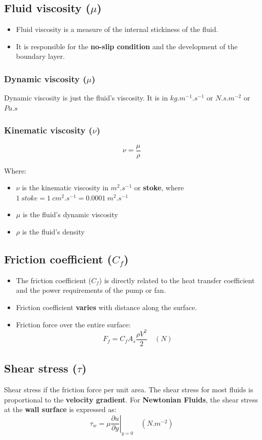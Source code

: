 \documentclass[11pt]{article}
\begin{document}
\subsection{Fluid viscosity (\(\mu\))}
\label{sec:org764c871}
\begin{itemize}
\item Fluid viscosity is a measure of the internal stickiness of the fluid.
\item It is responsible for the \textbf{no-slip condition} and the development of the boundary layer.
\end{itemize}
\subsubsection{Dynamic viscosity (\(\mu\))}
\label{sec:orgcde9aed}
Dynamic viscosity is just the fluid's viscosity. It is in \(\unit{kg.m^{-1}.s^{-1}}\) or \(\unit{N.s.m^{-2}}\) or \(\unit{Pa.s}\)
\subsubsection{Kinematic viscosity (\(\nu\))}
\label{sec:orgcfaa6bc}
\[\nu = \frac{\mu}{\rho}\]

Where:
\begin{itemize}
\item \(\nu\) is the kinematic viscosity in \(\unit{m^2.s^{-1}}\) or \textbf{stoke}, where \(\qty{1}{stoke} = \qty{1}{cm^2.s^{-1}} = \qty{0.0001}{m^2.s^{-1}}\)
\item \(\mu\) is the fluid's dynamic viscosity
\item \(\rho\) is the fluid's density
\end{itemize}
\subsection{Friction coefficient (\(C_f\))}
\label{sec:orge19477a}
\begin{itemize}
\item The friction coefficient (\(C_f\)) is directly related to the heat transfer coefficient and the power requirements of the pump or fan.
\item Friction coefficient \textbf{varies} with distance along the surface.
\item Friction force over the entire surface:
\[F_f = C_f A_s \frac{\rho V^2}{2} \quad (\unit{N})\]
\end{itemize}
\subsection{Shear stress (\(\tau\))}
\label{sec:org55b187c}
Shear stress if the friction force per unit area. The shear stress for most fluids is proportional to the \textbf{velocity gradient}. For \textbf{Newtonian Fluids}, the shear stress at the \textbf{wall surface} is expressed as:
\[\tau_{w} = \mu \left. \frac{\partial u}{\partial y} \right|_{y=0} \quad (\unit{N.m^{-2}})\]
\end{document}
